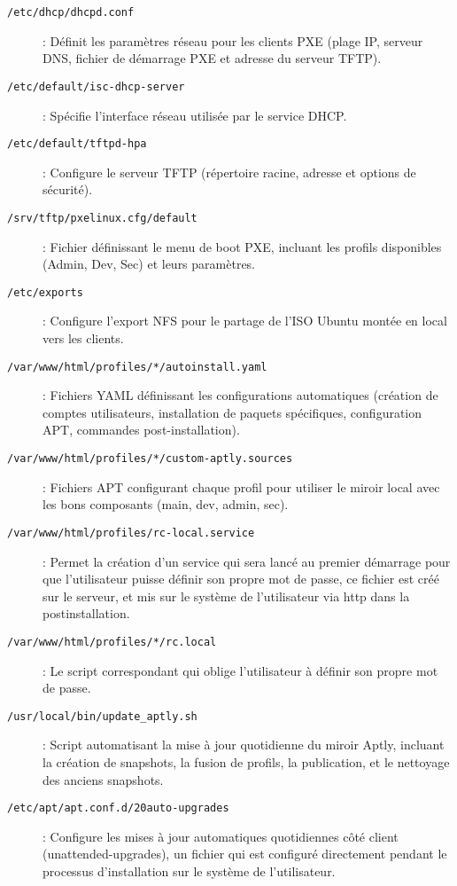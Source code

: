 \documentclass[a4paper,12pt]{article}
\begin{document}
\begin{description}

\item[\texttt{/etc/dhcp/dhcpd.conf}] :
Définit les paramètres réseau pour les clients PXE (plage IP, serveur DNS, fichier de démarrage PXE et adresse du serveur TFTP).

\item[\texttt{/etc/default/isc-dhcp-server}]:
Spécifie l'interface réseau utilisée par le service DHCP.

\item[\texttt{/etc/default/tftpd-hpa}]:
Configure le serveur TFTP (répertoire racine, adresse et options de sécurité).

\item[\texttt{/srv/tftp/pxelinux.cfg/default}]:
Fichier définissant le menu de boot PXE, incluant les profils disponibles (Admin, Dev, Sec) et leurs paramètres.

\item[\texttt{/etc/exports}]:
Configure l’export NFS pour le partage de l’ISO Ubuntu montée en local vers les clients.

\item[\texttt{/var/www/html/profiles/*/autoinstall.yaml}]:
Fichiers YAML définissant les configurations automatiques (création de comptes utilisateurs, installation de paquets spécifiques, configuration APT, commandes post-installation).

\item[\texttt{/var/www/html/profiles/*/custom-aptly.sources}]:
Fichiers APT configurant chaque profil pour utiliser le miroir local avec les bons composants (main, dev, admin, sec).

\item[\texttt{/var/www/html/profiles/rc-local.service}]:
Permet la création d'un service qui sera lancé au premier démarrage pour que l'utilisateur puisse définir son propre mot de passe, ce fichier est créé sur le serveur, et mis sur le système de l'utilisateur via http dans la postinstallation.

\item[\texttt{/var/www/html/profiles/*/rc.local}]:
Le script correspondant qui oblige l'utilisateur à définir son propre mot de passe.

\item[\texttt{/usr/local/bin/update\_aptly.sh}]:
Script automatisant la mise à jour quotidienne du miroir Aptly, incluant la création de snapshots, la fusion de profils, la publication, et le nettoyage des anciens snapshots.

\item[\texttt{/etc/apt/apt.conf.d/20auto-upgrades}]:
Configure les mises à jour automatiques quotidiennes côté client (unattended-upgrades), un fichier qui est configuré directement pendant le processus d'installation sur le système de l'utilisateur.

\end{description}
\end{document}
